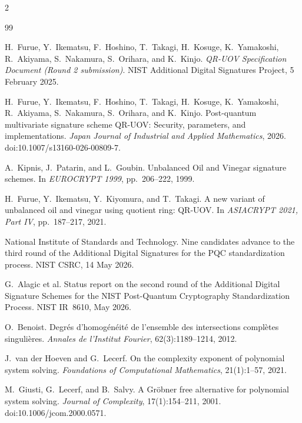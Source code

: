 \documentclass[11pt,a4paper]{article}
\theoremstyle{definition}
\theoremstyle{remark}
\begin{document}
\begin{multicols}{2}
\raggedcolumns
\begin{thebibliography}{99}
\fontsize{8.5pt}{9.6pt}\selectfont
\setlength{\itemsep}{0pt}
\setlength{\parsep}{0pt}

H.~Furue, Y.~Ikematsu, F.~Hoshino, T.~Takagi, H.~Kosuge, K.~Yamakoshi, R.~Akiyama, S.~Nakamura, S.~Orihara, and K.~Kinjo.
\newblock \emph{QR-UOV Specification Document (Round 2 submission)}.
\newblock NIST Additional Digital Signatures Project, 5 February 2025.

H.~Furue, Y.~Ikematsu, F.~Hoshino, T.~Takagi, H.~Kosuge, K.~Yamakoshi, R.~Akiyama, S.~Nakamura, S.~Orihara, and K.~Kinjo.
\newblock Post-quantum multivariate signature scheme QR-UOV: Security, parameters, and implementations.
\newblock \emph{Japan Journal of Industrial and Applied Mathematics}, 2026.
\newblock doi:10.1007/s13160-026-00809-7.

A.~Kipnis, J.~Patarin, and L.~Goubin.
\newblock Unbalanced Oil and Vinegar signature schemes.
\newblock In \emph{EUROCRYPT 1999}, pp.~206--222, 1999.

H.~Furue, Y.~Ikematsu, Y.~Kiyomura, and T.~Takagi.
\newblock A new variant of unbalanced oil and vinegar using quotient ring: QR-UOV.
\newblock In \emph{ASIACRYPT 2021, Part IV}, pp.~187--217, 2021.

National Institute of Standards and Technology.
\newblock Nine candidates advance to the third round of the Additional Digital Signatures for the PQC standardization process.
\newblock NIST CSRC, 14 May 2026.

G.~Alagic et al.
\newblock Status report on the second round of the Additional Digital Signature Schemes for the NIST Post-Quantum Cryptography Standardization Process.
\newblock NIST IR~8610, May 2026.

O.~Benoist.
\newblock Degr\'es d'homog\'en\'eit\'e de l'ensemble des intersections compl\`etes singuli\`eres.
\newblock \emph{Annales de l'Institut Fourier}, 62(3):1189--1214, 2012.

J.~van der Hoeven and G.~Lecerf.
\newblock On the complexity exponent of polynomial system solving.
\newblock \emph{Foundations of Computational Mathematics}, 21(1):1--57, 2021.

M.~Giusti, G.~Lecerf, and B.~Salvy.
\newblock A Gr\"obner free alternative for polynomial system solving.
\newblock \emph{Journal of Complexity}, 17(1):154--211, 2001.
\newblock doi:10.1006/jcom.2000.0571.


\end{thebibliography}
\end{multicols}
\end{document}
